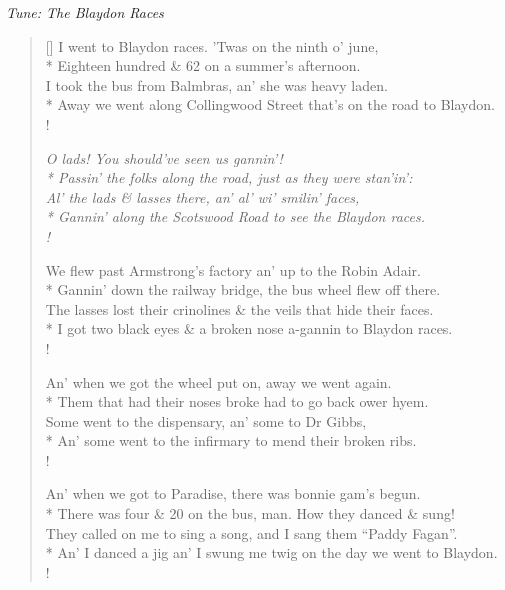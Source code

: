 \documentclass[MAIN]{subfiles}
\begin{document}
\begin{center}
\emph{Tune: The Blaydon Races}
\end{center}

\bigskip

\begin{verse}[\versewidth]
I went to {\sc Blaydon} races. 'Twas on the ninth o' june,\\*
Eighteen hundred \& 62 on a summer's afternoon.\\
I took the bus from {\sc Balmbras}, an' she was heavy laden.\\*
Away we went along {\sc Collingwood Street} that's on the road to {\sc Blaydon}.\\!

{\it O lads! You should've seen us gannin'!\\*
Passin' the folks along the road, just as they were stan'in':\\
Al' the lads \& lasses there, an' al' wi' smilin' faces,\\*
Gannin' along the {\sc Scotswood Road} to see the {\sc Blaydon} races.\\!}

We flew past Armstrong's factory an' up to the {\sc Robin Adair}.\\*
Gannin' down the railway bridge, the bus wheel flew off there.\\
The lasses lost their crinolines \& the veils that hide their faces.\\*
I got two black eyes \& a broken nose a-gannin to {\sc Blaydon} races.\\!

An' when we got the wheel put on, away we went again.\\*
Them that had their noses broke had to go back ower hyem.\\
Some went to the dispensary, an' some to Dr Gibbs,\\*
An' some went to the infirmary to mend their broken ribs.\\!

An' when we got to {\sc Paradise}, there was bonnie gam's begun.\\*
There was four \& 20 on the bus, man. How they danced \& sung!\\
They called on me to sing a song, and I sang them ``Paddy Fagan''.\\*
An' I danced a jig an' I swung me twig on the day we went to {\sc Blaydon}.\\!


\end{verse}
\end{document}
